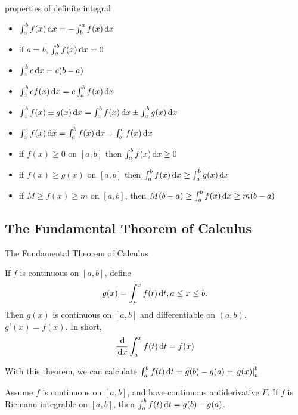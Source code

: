 \documentclass[Calculus 1 Recitation.tex]{subfiles}
\begin{document}
\begin{myleftlinebox}
	properties of definite integral
	\tcblower
	\begin{itemize}
		\item $\int_a^b f(x)\,\mathrm{d} x = -\int_b^a f(x) \,\mathrm{d} x$
		\item if $a=b$, $\int_a^b f(x)\,\mathrm{d} x =0$
		\item $\int_a^b c\,\mathrm{d} x =c(b-a)$
		\item $\int_a^b cf(x)\,\mathrm{d} x =c\int_a^b f(x)\,\mathrm{d} x $
		\item $\int_a^b f(x)\pm g(x)\,\mathrm{d} x = \int_a^b f(x)\,\mathrm{d} x \pm \int_a^b g(x)\,\mathrm{d} x$
		\item $\int_a^c f(x)\,\mathrm{d} x = \int_a^b f(x)\,\mathrm{d} x +\int_b^c f(x)\,\mathrm{d} x$
		\item if $f(x)\geq 0$ on $[a,b]$ then $\int_a^b f(x)\,\mathrm{d} x \geq 0$
		\item if $f(x)\geq g(x)$ on $[a,b]$ then $\int_a^b f(x)\,\mathrm{d} x \geq \int_a^b g(x)\,\mathrm{d} x$
		\item if $M\geq f(x)\geq m$ on $[a,b]$, then $M(b-a) \geq \int_a^b f(x)\,\mathrm{d} x \geq m(b-a)$
	\end{itemize}
\end{myleftlinebox}

\subsection{The Fundamental Theorem of Calculus}
\begin{myleftlinebox}
	The Fundamental Theorem of Calculus
	\tcblower
	\begin{theorem}
		If $f$ is continuous on $[a,b]$, define 
		\[g(x)=\int_{a}^x f(t)\,\mathrm{d} t, a\leq x\leq b.\]
		Then $g(x)$ is continuous on $[a,b]$ and differentiable on $(a,b)$. $g'(x)=f(x)$. In short,
		\[\frac{\,\mathrm{d}}{\,\mathrm{d} x}\int_a^x f(t)\,\mathrm{d} t=f(x)\]
	\end{theorem}
	With this theorem, we can calculate $\int_a^b f(t)\,\mathrm{d} t=g(b)-g(a)=\left.g(x)\right|_a^b$
	\begin{theorem}
		Assume $f$ is continuous on $[a,b]$, and have continuous antiderivative $F$. If $f$ is Riemann integrable on $[a,b]$, then $\int_a^b f(t)\,\mathrm{d} t=g(b)-g(a)$.
	\end{theorem}
\end{myleftlinebox}
\end{document}
